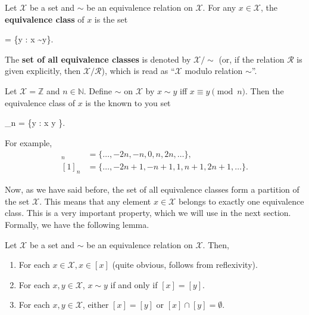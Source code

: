 \documentclass[../../book.tex]{subfiles}
\begin{document}
\begin{definition}
    Let $\mathcal{X}$ be a set and $\sim$ be an equivalence relation on $\mathcal{X}$. For any $x \in \mathcal{X}$, the \textbf{equivalence class} of $x$ is the set
    \begin{xequation*}
        [x] = \{y \in {}: x \sim y\}.
    \end{xequation*}
    The \textbf{set of all equivalence classes} is denoted by $\mathcal{X}/\text{$\sim$}$ (or, if the relation $\mathcal{R}$ is given explicitly, then $\mathcal{X}/\mathcal{R}$), which is read as ``$\mathcal{X}$ modulo relation $\sim$''.
\end{definition}

\begin{example}
    Let $\mathcal{X} = \mathbb{Z}$ and $n \in \mathbb{N}$. Define $\sim$ on $\mathcal{X}$ by $x \sim y$ iff $x \equiv y \pmod{n}$. Then the equivalence class of $x$ is the known to you set
    \begin{xequation*}
        [x]_n = \{y \in {}: x \equiv y \}.
    \end{xequation*}

    For example, 
    \begin{align*}
        [0]_n &= \{\ldots,-2n,-n,0,n,2n,\ldots\}, \\
        [1]_n &= \{\ldots,-2n+1,-n+1,1,n+1,2n+1,\ldots\}.    
    \end{align*}
    
\end{example}

Now, as we have said before, the set of all equivalence classes form a partition of the set $\mathcal{X}$. This means that any element $x \in \mathcal{X}$ belongs to exactly one equivalence class. This is a very important property, which we will use in the next section. Formally, we have the following lemma.
\begin{lemma}
    Let $\mathcal{X}$ be a set and $\sim$ be an equivalence relation on $\mathcal{X}$. Then,
    \begin{enumerate}
        \item For each $x \in \mathcal{X}, x \in [x]$ (quite obvious, follows from reflexivity).
        \item For each $x,y \in \mathcal{X}$, $x \sim y$ if and only if $[x] = [y]$.
        \item For each $x,y \in \mathcal{X}$, either $[x]=[y]$ or $[x] \cap [y] = \emptyset$.
    \end{enumerate}
\end{lemma}
\end{document}
